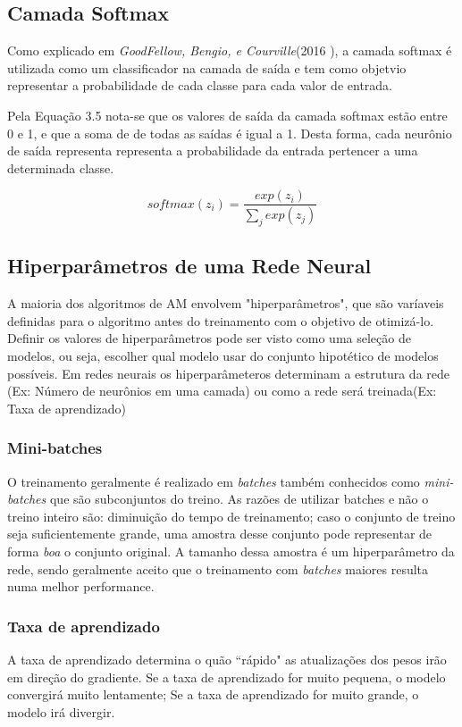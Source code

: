 \subsection{Camada Softmax}

Como explicado em \textit{GoodFellow, Bengio, e Courville}(2016 \cite{Goodfellow2016}), a camada softmax é utilizada como um classificador na camada de saída e tem como objetvio representar a probabilidade de cada classe para cada valor de entrada.

Pela Equação 3.5 nota-se que os valores de saída da camada softmax estão entre 0 e 1, e que a soma de de todas as saídas é igual a 1. Desta forma, cada neurônio de saída representa representa a probabilidade da entrada pertencer a uma determinada classe.

\begin{equation}
softmax(z_i) = \frac{exp(z_i)}{\sum_{j}^{} exp(z_j)}
\end{equation}


\subsection{Hiperparâmetros de uma Rede Neural}
A maioria dos algoritmos de AM envolvem "hiperparâmetros", que são varíaveis definidas para o algoritmo antes do treinamento com o objetivo de otimizá-lo. Definir os valores de hiperparâmetros pode ser visto como uma seleção de modelos, ou seja, escolher qual modelo usar do conjunto hipotético de modelos possíveis. Em redes neurais os hiperparâmeteros determinam a estrutura da rede (Ex: Número de neurônios em uma camada) ou como a rede será treinada(Ex: Taxa de aprendizado)

\subsubsection{Mini-batches}
O treinamento geralmente é realizado em \textit{batches} também conhecidos como \textit{mini-batches} que são subconjuntos do treino. As razões de utilizar batches e não o treino inteiro são: diminuição do tempo de treinamento; caso o conjunto de treino seja suficientemente grande, uma amostra desse conjunto pode representar de forma \textit{boa} o conjunto original. A tamanho dessa amostra é um hiperparâmetro da rede, sendo geralmente aceito que o treinamento com \textit{batches} maiores resulta numa melhor performance.

\subsubsection{Taxa de aprendizado}
A taxa de aprendizado  determina o quão ``rápido" as atualizações dos pesos irão em direção do gradiente. Se a taxa de aprendizado for muito pequena, o modelo convergirá muito lentamente; Se a taxa de aprendizado for muito grande, o modelo irá divergir. 




